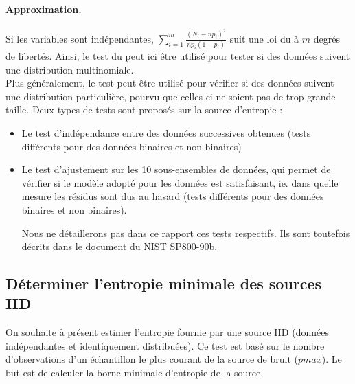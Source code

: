 \paragraph{Approximation.\\}
Si les variables sont indépendantes, $\sum \limits_{i=1}^m \frac{(N_i - np_i)^2}{np_i(1-p_i)}$ suit une loi du \chidpdf à $m$ degrés de libertés. Ainsi, le test du \chidpdf peut ici être utilisé pour tester si des données suivent une distribution multinomiale.\\


Plus généralement, le test peut être utilisé pour vérifier si des données suivent une distribution particulière, pourvu que celles-ci ne soient pas de trop grande taille. Deux types de tests sont proposés sur la source d'entropie : 
\begin{itemize}
\item Le test d'indépendance entre des données successives obtenues (tests différents pour des données binaires et non binaires)
\item Le test d'ajustement sur les 10 sous-ensembles de données, qui permet de vérifier si le modèle adopté pour les données est satisfaisant, ie. dans quelle mesure les résidus sont dus au hasard (tests différents pour des données binaires et non binaires). 

Nous ne détaillerons pas dans ce rapport ces tests respectifs. Ils sont toutefois décrits dans le document du NIST SP800-90b.

\end{itemize}



\subsection{Déterminer l'entropie minimale des sources IID}
On souhaite à présent estimer l'entropie fournie par une source IID (données indépendantes et identiquement distribuées). 
Ce test est basé sur le nombre d'observations d'un échantillon le plus courant de la source de bruit ($pmax$). Le but est de calculer la borne minimale d'entropie de la source.\\


